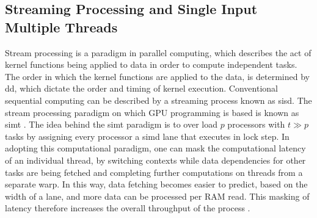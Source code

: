 \subsection{Streaming Processing and Single Input Multiple Threads}
Stream processing is a paradigm in parallel computing, which describes the act
of kernel functions being applied to data in order to compute independent tasks.
The order in which the kernel functions are applied to the data, is determined by
\gls{dd}, which dictate the order and timing of kernel execution. Conventional
sequential computing can be described by a streaming process known as \gls{sisd}.
The stream processing paradigm on which GPU programming is based is known as \gls{simt}
 \cite{advancedTopics}.  The idea behind the \gls{simt} paradigm is to over load
 $p$ processors with $t \gg p$ tasks by assigning every processor a \gls{simd} lane
 that executes in lock step.  In adopting this computational paradigm, one can mask
 the computational latency of an individual thread, by switching contexts while
 data dependencies for other tasks are being fetched and
 completing further computations on threads from a separate warp.  In this way,
 data fetching becomes easier to predict, based on the width of a lane, and more
 data can be processed per \gls{RAM} read.   This masking of latency therefore increases
 the overall throughput of the process \cite{advancedtopics}.


